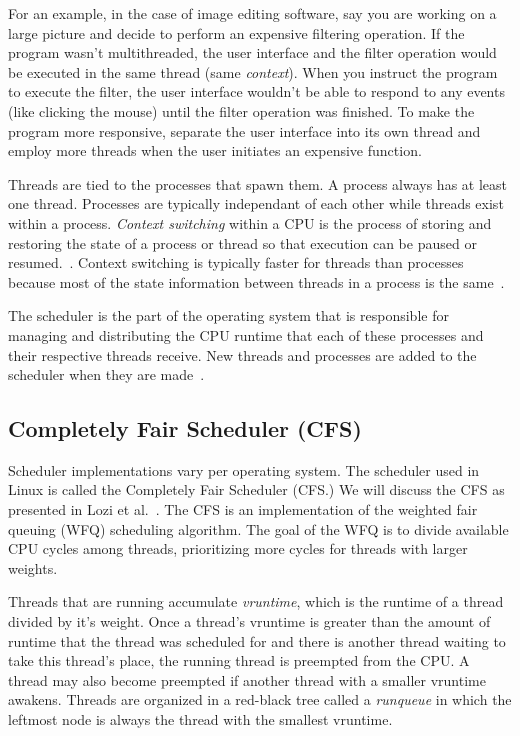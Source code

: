 \documentclass{sig-alternate}
\begin{document}
For an example, in the case of image editing software, say you are working on a large picture and decide to perform an expensive filtering operation. If the program wasn't multithreaded, the user interface and the filter operation would be executed in the same thread (same \emph{context}). When you instruct the program to execute the filter, the user interface wouldn't be able to respond to any events (like clicking the mouse) until the filter operation was finished. To make the program more responsive, separate the user interface into its own thread and employ more threads when the user initiates an expensive function.
	
Threads are tied to the processes that spawn them. A process always has at least one thread. Processes are typically independant of each other while threads exist within a process. \emph{Context switching} within a CPU is the process of storing and restoring the state of a process or thread so that execution can be paused or resumed.~\cite{WikiContext}. Context switching is typically faster for threads than processes because most of the state information between threads in a process is the same~\cite{WikiThreads}. 

The scheduler is the part of the operating system that is responsible for managing and distributing the CPU runtime that each of these processes and their respective threads receive. New threads and processes are added to the scheduler when they are made~\cite{Lozi:2016}.

\subsection{Completely Fair Scheduler (CFS)}
\label{sec:cfs}

Scheduler implementations vary per operating system. The scheduler used in Linux is called the Completely Fair Scheduler (CFS.) We will discuss the CFS as presented in Lozi et al.~\cite{Lozi:2016}. The CFS is an implementation of the weighted fair queuing (WFQ) scheduling algorithm. The goal of the WFQ is to divide available CPU cycles among threads, prioritizing more cycles for threads with larger weights.

Threads that are running accumulate \emph{vruntime}, which is the runtime of a thread divided by it's weight. Once a thread's vruntime is greater than the amount of runtime that the thread was scheduled for and there is another thread waiting to take this thread's place, the running thread is preempted from the CPU. A thread may also become preempted if another thread with a smaller vruntime awakens. Threads are organized in a red-black tree called a \emph{runqueue} in which the leftmost node is always the thread with the smallest vruntime.~\cite{Lozi:2016}
\end{document}
